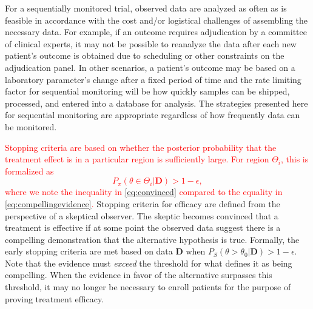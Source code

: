 \documentclass[12pt]{article}
\begin{document}
For a sequentially monitored trial, observed data are analyzed as often as is feasible in accordance with 
the cost and/or logistical challenges of assembling the necessary data.
%
For example, if an outcome requires adjudication by a committee of clinical experts, it may not be possible to reanalyze the
data after each new patient's outcome is obtained due to scheduling or other constraints on the adjudication panel.
%
In other scenarios, a patient's outcome may be based on a laboratory parameter's change after a fixed period of time
and the rate limiting factor for sequential monitoring will be how quickly samples can be shipped, processed, and entered
into a database for analysis.  
%
The strategies presented here for sequential monitoring are appropriate regardless of how frequently data can be monitored.


\textcolor{red}{Stopping criteria are based on whether the posterior probability that the treatment effect is in a particular region is sufficiently large. For region $\Theta_i$, this is formalized as
\begin{equation}\label{eq:convinced}
		P_\pi(\theta\in\Theta_i|\mathbf{D}) > 1-\epsilon,
\end{equation} 
where we note the inequality in \eqref{eq:convinced} compared to the equality in \eqref{eq:compellingevidence}.
}
Stopping criteria for efficacy are defined from the perspective of a skeptical observer. 
The skeptic becomes convinced that a treatment is effective if at some point the observed data suggest there is 
a compelling demonstration that the alternative hypothesis is true. 
Formally, the early stopping criteria are met based on data $\mathbf{D}$ when $P_S(\theta>\theta_0|\mathbf{D})>1-\epsilon$.
Note that the evidence must \textit{exceed} the threshold for what defines it as being compelling.
When the evidence in favor of the alternative surpasses this threshold, it may no longer be necessary to 
enroll patients for the purpose of proving treatment efficacy.
\end{document}
